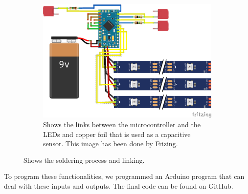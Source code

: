 \documentclass[00_doc.tex]{subfiles}
\begin{document}
\begin{figure}[H]
\begin{subfigure}{.45\textwidth}
            \centering
            \includegraphics[width=0.8\linewidth]{images/process/sensorLinks.png}
            \caption{Shows the links between the microcontroller and the LEDs and copper foil that is 
            used as a capacitive sensor. This image has been done by Frizing. \cite{fritzing}}
            \label{fig:solderingProcess_3}
            \vspace{6mm}
        \end{subfigure}
        \caption{Shows the soldering process and linking.}
        \label{fig:solderingProcess}
    \end{figure}

    \noindent
    To program these functionalities, we programmed an Arduino program that can deal with these inputs 
    and outputs. The final code can be found on GitHub. %
\end{document}
